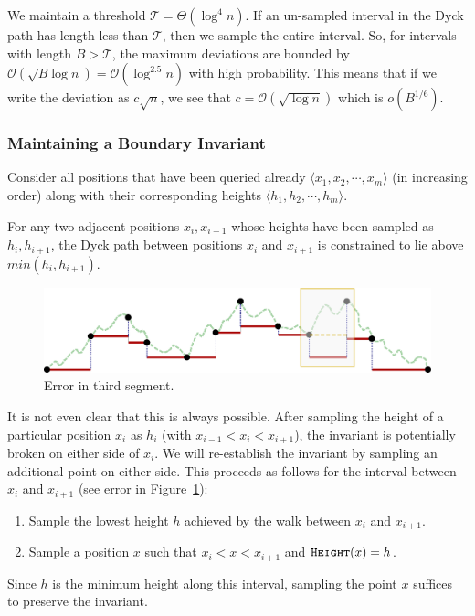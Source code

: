 We maintain a threshold $\mathcal T = \Theta(\log^4 n)$.
If an un-sampled interval in the Dyck path has length less than $\mathcal T$, then we sample the entire interval.
So, for intervals with length $B > \mathcal T$,
the maximum deviations are bounded by $\mathcal O(\sqrt{B\log n}) = \mathcal O(\log^{2.5}n)$ with high probability.
This means that if we write the deviation as $c\sqrt n$, we see that $c = \mathcal O(\sqrt{\log n})$ which is $o(B^{1/6})$.


\subsubsection{Maintaining a Boundary Invariant}%
\label{sec:maintaining_a_boundary_invariant}
Consider all positions that have been queried already $ \langle x_1, x_2,\cdots, x_m \rangle$ (in increasing order)
along with their corresponding heights $ \langle h_1, h_2,\cdots, h_m \rangle$.
\begin{proposition}
\label{prop:boundary_invariant}
For any two adjacent positions $x_i,x_{i+1}$ whose heights have been sampled as $h_i, h_{i+1}$,
the Dyck path between positions $x_i$ and $x_{i+1}$ is constrained to lie above $min(h_i, h_{i+1})$.
\end{proposition}
\begin{figure}[htpb]
    \centering
    \includegraphics[width=\textwidth]{images/dyck_boundary_invariant.pdf}
    \caption{Error in third segment.}
    \label{fig:dyck_boundary_invariant}
\end{figure}

It is not even clear that this is always possible.
After sampling the height of a particular position $x_i$ as $h_i$ (with $x_{i-1} < x_i < x_{i+1}$),
the invariant is potentially broken on either side of $x_i$.
We will re-establish the invariant by sampling an additional point on either side.
This proceeds as follows for the interval between $x_i$ and $x_{i+1}$
(see error in Figure~\ref{fig:dyck_boundary_invariant}):
\begin{enumerate}
    \item Sample the lowest height $h$ achieved by the walk between $x_i$ and $x_{i+1}$.
    \item Sample a position $x$ such that $x_i < x < x_{i+1}$ and $\texttt{\textsc{Height}}(x) = h$.
\end{enumerate}
Since $h$ is the minimum height along this interval, sampling the point $x$ suffices to preserve the invariant.


